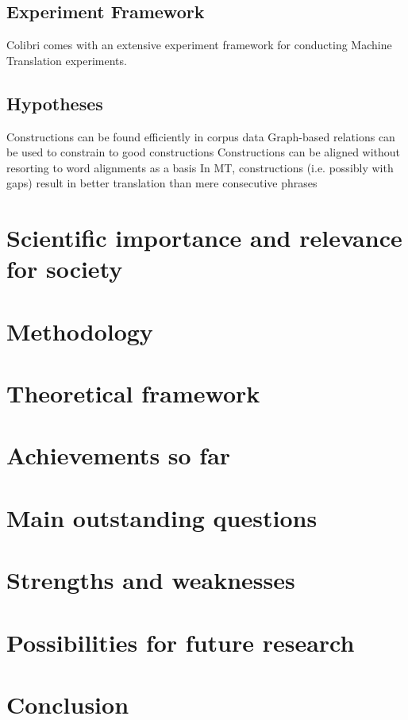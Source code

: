 \documentclass[12pt]{article}
\begin{document}
\subsection{Experiment Framework} Colibri comes with an extensive experiment framework for conducting Machine Translation experiments.\

\subsection{Hypotheses} %

Constructions can be found efficiently in corpus data
Graph-based relations can be used to constrain to good constructions
Constructions can be aligned without resorting to word alignments as a basis
In MT, constructions (i.e. possibly with gaps) result in better translation than mere consecutive phrases

\section{Scientific importance and relevance for society}


\section{Methodology}


\section{Theoretical framework}
\section{Achievements so far}
\section{Main outstanding questions}
\section{Strengths and weaknesses}
\section{Possibilities for future research}
\section{Conclusion}
\end{document}
